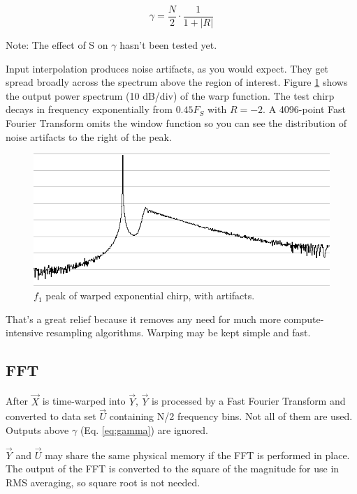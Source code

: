 \begin{equation} \label{eq:gamma}
\gamma = \frac{N}{2} \cdot \frac{1}{1 + |R|}
\end{equation}

Note: The effect of S on $\gamma$ hasn't been tested yet.

Input interpolation produces noise artifacts, as you would expect.
They get spread broadly across the spectrum above the region of interest.
Figure \ref{fig:inwarpspec} shows the output power spectrum (10 dB/div) of
the warp function. The test chirp decays in frequency exponentially from
$0.45 F_S$ with $R=-2$.
A 4096-point Fast Fourier Transform omits the window function so you can
see the distribution of noise artifacts to the right of the peak.

\begin{figure}
  \includegraphics[width=\linewidth]{../source/inwarpspec.png}
  \caption{$f_1$ peak of warped exponential chirp, with artifacts.}
  \label{fig:inwarpspec}
\end{figure}

That's a great relief because it removes any need for much more
compute-intensive resampling algorithms. Warping may be kept simple and fast.


\subsection{FFT}

After $\vec{X}$ is time-warped into $\vec{Y}$, $\vec{Y}$ is processed by a
Fast Fourier Transform and converted to data set $\vec{U}$ containing N/2
frequency bins. Not all of them are used.
Outputs above $\gamma$ (Eq. \ref{eq:gamma}) are ignored.

$\vec{Y}$ and $\vec{U}$ may share the
same physical memory if the FFT is performed in place.
The output of the FFT is converted to the square of the magnitude for use in
RMS averaging, so square root is not needed.


